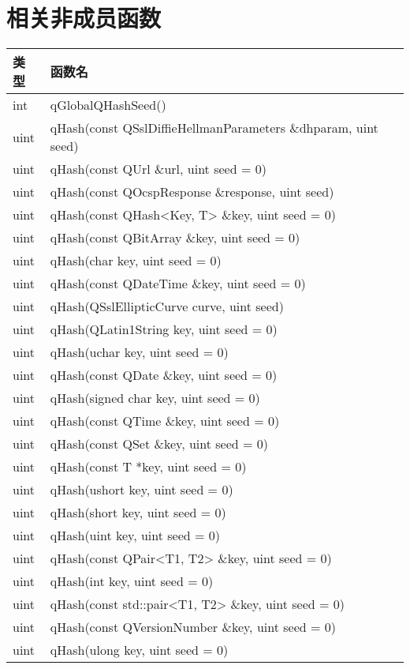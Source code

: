 \section{相关非成员函数}

\begin{longtable}[l]{|l|l|}
\hline
类型	&函数名\\
\hline
int& 	qGlobalQHashSeed()\\
\hline
uint& 	qHash(const QSslDiffieHellmanParameters \&dhparam, uint
      seed)\\
\hline
uint& 	qHash(const QUrl \&url, uint seed = 0)\\
\hline
uint& 	qHash(const QOcspResponse \&response, uint seed)\\
\hline
uint& 	qHash(const QHash<Key, T> \&key, uint seed = 0)\\
\hline
uint& 	qHash(const QBitArray \&key, uint seed = 0)\\
\hline
uint& 	qHash(char key, uint seed = 0)\\
\hline
uint& 	qHash(const QDateTime \&key, uint seed = 0)\\
\hline
uint& 	qHash(QSslEllipticCurve curve, uint seed)\\
\hline
uint& 	qHash(QLatin1String key, uint seed = 0)\\
\hline
uint& 	qHash(uchar key, uint seed = 0)\\
\hline
uint& 	qHash(const QDate \&key, uint seed = 0)\\
\hline
uint& 	qHash(signed char key, uint seed = 0)\\
\hline
uint& 	qHash(const QTime \&key, uint seed = 0)\\
\hline
uint& 	qHash(const QSet \&key, uint seed = 0)\\
\hline
uint& 	qHash(const T *key, uint seed = 0)\\
\hline
uint& 	qHash(ushort key, uint seed = 0)\\
\hline
uint& 	qHash(short key, uint seed = 0)\\
\hline
uint& 	qHash(uint key, uint seed = 0)\\
\hline
uint& 	qHash(const QPair<T1, T2> \&key, uint seed = 0)\\
\hline
uint& 	qHash(int key, uint seed = 0)\\
\hline
uint& 	qHash(const std::pair<T1, T2> \&key, uint seed = 0)\\
\hline
uint& 	qHash(const QVersionNumber \&key, uint seed = 0)\\
\hline
uint& 	qHash(ulong key, uint seed = 0)\\

\end{longtable}
